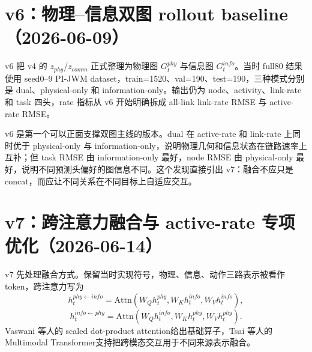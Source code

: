 \documentclass[UTF8,a4paper,11pt]{ctexart}
\newcommand{\code}[1]{\texttt{#1}}
\begin{document}
\section{v6：物理--信息双图 rollout baseline（2026-06-09）}

v6 把 v4 的 $z_{phy}$/$z_{comm}$ 正式整理为物理图 $G_t^{phy}$ 与信息图 $G_t^{info}$。当时 full80 结果使用 seed0--9 PI-JWM dataset，train=1520、val=190、test=190，三种模式分别是 dual、physical-only 和 information-only。输出仍为 node、activity、link-rate 和 task 四头，rate 指标从 v6 开始明确拆成 all-link link-rate RMSE 与 active-rate RMSE。

\begin{table}[H]
\centering
\small
{}
\caption{v6 full80 正式消融结果，来源为 \code{pi\_jwm\_609\_metrics.csv}。}
\end{table}

v6 是第一个可以正面支撑双图主线的版本。dual 在 active-rate 和 link-rate 上同时优于 physical-only 与 information-only，说明物理几何和信息状态在链路速率上互补；但 task RMSE 由 information-only 最好，node RMSE 由 physical-only 最好，说明不同预测头偏好的图信息不同。这个发现直接引出 v7：融合不应只是 concat，而应让不同关系在不同目标上自适应交互。

\section{v7：跨注意力融合与 active-rate 专项优化（2026-06-14）}

v7 先处理融合方式。保留当时实现符号，物理、信息、动作三路表示被看作 token，跨注意力写为
\[
h_t^{phy\leftarrow info}=\mathrm{Attn}(W_Qh_t^{phy},W_Kh_t^{info},W_Vh_t^{info}),
\]
\[
h_t^{info\leftarrow phy}=\mathrm{Attn}(W_Qh_t^{info},W_Kh_t^{phy},W_Vh_t^{phy}).
\]
Vaswani 等人的 scaled dot-product attention给出基础算子，Tsai 等人的 Multimodal Transformer支持把跨模态交互用于不同来源表示融合。
\end{document}
